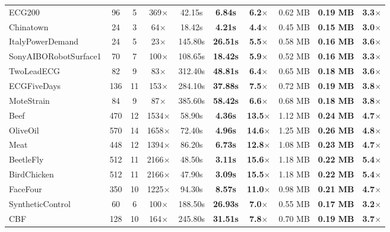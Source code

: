 \documentclass[conference]{IEEEtran}
\begin{document}
\begin{table}[!t]
\begin{tabular}{|l|c|c|c|c|c|c|c|c|c|}
ECG200 & 96 & 5 & 369$\times$ & 42.15s & \textbf{6.84s} & \textbf{6.2$\times$} & 0.62 MB & \textbf{0.19 MB} & \textbf{3.3$\times$} \\
Chinatown & 24 & 3 & 64$\times$ & 18.42s & \textbf{4.21s} & \textbf{4.4$\times$} & 0.45 MB & \textbf{0.15 MB} & \textbf{3.0$\times$} \\
ItalyPowerDemand & 24 & 5 & 23$\times$ & 145.80s & \textbf{26.51s} & \textbf{5.5$\times$} & 0.58 MB & \textbf{0.16 MB} & \textbf{3.6$\times$} \\
SonyAIBORobotSurface1 & 70 & 7 & 100$\times$ & 108.65s & \textbf{18.42s} & \textbf{5.9$\times$} & 0.52 MB & \textbf{0.16 MB} & \textbf{3.3$\times$} \\
TwoLeadECG & 82 & 9 & 83$\times$ & 312.40s & \textbf{48.81s} & \textbf{6.4$\times$} & 0.65 MB & \textbf{0.18 MB} & \textbf{3.6$\times$} \\
ECGFiveDays & 136 & 11 & 153$\times$ & 284.10s & \textbf{37.88s} & \textbf{7.5$\times$} & 0.72 MB & \textbf{0.19 MB} & \textbf{3.8$\times$} \\
MoteStrain & 84 & 9 & 87$\times$ & 385.60s & \textbf{58.42s} & \textbf{6.6$\times$} & 0.68 MB & \textbf{0.18 MB} & \textbf{3.8$\times$} \\
Beef & 470 & 12 & 1534$\times$ & 58.90s & \textbf{4.36s} & \textbf{13.5$\times$} & 1.12 MB & \textbf{0.24 MB} & \textbf{4.7$\times$} \\
OliveOil & 570 & 14 & 1658$\times$ & 72.40s & \textbf{4.96s} & \textbf{14.6$\times$} & 1.25 MB & \textbf{0.26 MB} & \textbf{4.8$\times$} \\
Meat & 448 & 12 & 1394$\times$ & 86.20s & \textbf{6.73s} & \textbf{12.8$\times$} & 1.08 MB & \textbf{0.23 MB} & \textbf{4.7$\times$} \\
BeetleFly & 512 & 11 & 2166$\times$ & 48.50s & \textbf{3.11s} & \textbf{15.6$\times$} & 1.18 MB & \textbf{0.22 MB} & \textbf{5.4$\times$} \\
BirdChicken & 512 & 11 & 2166$\times$ & 47.90s & \textbf{3.09s} & \textbf{15.5$\times$} & 1.18 MB & \textbf{0.22 MB} & \textbf{5.4$\times$} \\
FaceFour & 350 & 10 & 1225$\times$ & 94.30s & \textbf{8.57s} & \textbf{11.0$\times$} & 0.98 MB & \textbf{0.21 MB} & \textbf{4.7$\times$} \\
SyntheticControl & 60 & 6 & 100$\times$ & 188.50s & \textbf{26.93s} & \textbf{7.0$\times$} & 0.55 MB & \textbf{0.17 MB} & \textbf{3.2$\times$} \\
CBF & 128 & 10 & 164$\times$ & 245.80s & \textbf{31.51s} & \textbf{7.8$\times$} & 0.70 MB & \textbf{0.19 MB} & \textbf{3.7$\times$} \\

\end{tabular}
\end{table}
\end{document}
